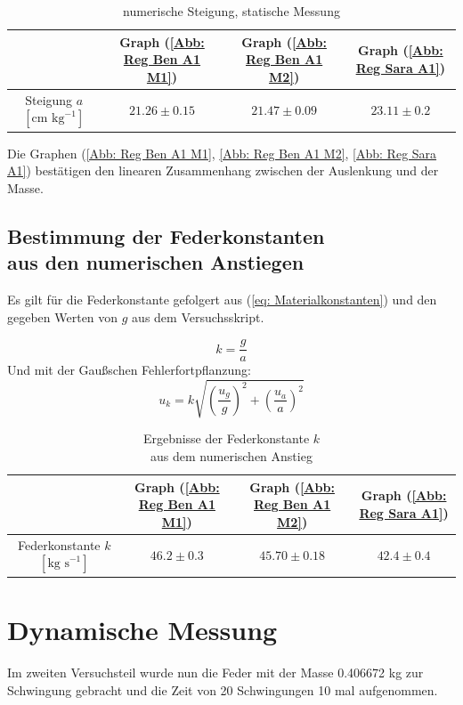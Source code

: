 \documentclass[bibliography=totocnumbered]{scrartcl}
\begin{document}
\begin{table}[ht!]
	\centering
	\caption{numerische Steigung, statische Messung}
	\begin{tabular}{|c|c|c|c|}
		\hline
		& Graph (\ref{Abb: Reg Ben A1 M1}) & Graph (\ref{Abb: Reg Ben A1 M2}) & Graph (\ref{Abb: Reg Sara A1}) \\
		\hline
		Steigung $ a $ $[\text{cm } \text{kg}^{-1}]  $ & $ 21.26\pm0.15 $ & $ 21.47\pm0.09$ & $ 23.11\pm 0.2 $ \\
		\hline
	\end{tabular}
	\label{tab: Fk, numerisch, A1}
\end{table}
	Die Graphen (\ref{Abb: Reg Ben A1 M1}, \ref{Abb: Reg Ben A1 M2}, \ref{Abb: Reg Sara A1}) bestätigen den linearen Zusammenhang zwischen der Auslenkung und der
	Masse.
	\newpage
	\subsection{Bestimmung der Federkonstanten \\aus den numerischen Anstiegen}
	Es gilt für die Federkonstante gefolgert aus (\ref{eq: Materialkonstanten}) und den gegeben Werten von $ g $ aus dem Versuchsskript\smartcite{Muller.b}.

	\begin{equation}
		k=\dfrac{g}{a}
	\end{equation}
	Und mit der Gaußschen Fehlerfortpflanzung:
	\begin{equation}
		u_{k}=k\sqrt{\left(\dfrac{u_{g}}{g}\right)^{2}+\left(\dfrac{u_{a}}{a}\right)^{2}}
	\end{equation}
	
	\begin{table}[ht!]
		\centering
		\caption{Ergebnisse der Federkonstante $ k $ \\aus dem numerischen Anstieg}
		\begin{tabular}{|c|c|c|c|}
			\hline
			&  Graph (\ref{Abb: Reg Ben A1 M1}) & Graph (\ref{Abb: Reg Ben A1 M2}) & Graph (\ref{Abb: Reg Sara A1}) \\
			\hline
			Federkonstante $ k $ $ [\text{kg s}^{-1}] $& $ 46.2\pm0.3 $ & $ 45.70\pm0.18 $ & $ 42.4\pm 0.4  $\\
			\hline
		\end{tabular}
		\label{tab: k numerisch A1}
	\end{table}
	
	\section{Dynamische Messung}
	Im zweiten Versuchsteil wurde nun die Feder mit der Masse 0.406672 kg zur Schwingung gebracht und die Zeit von 20 Schwingungen 10 mal aufgenommen.
\end{document}
